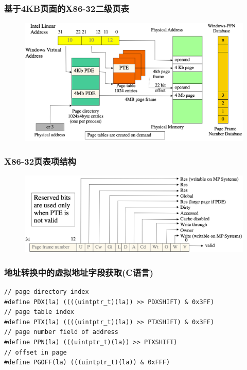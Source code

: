 \begin{frame}
    \frametitle{基于4KB页面的X86-32二级页表}
    \begin{figure}
    \includegraphics[width=0.8\linewidth]{figs/x86-32-addr-translation.png}
    \end{figure}
\end{frame}
% 
% 
% 
\begin{frame}
    \frametitle{X86-32页表项结构}
    \begin{figure}
    \includegraphics[width=1.0\linewidth]{figs/x86-32-page-tabel-entry.png}
    \end{figure}
\end{frame}
% 
% 
\begin{frame}
    \frametitle{地址转换中的虚拟地址字段获取(C语言)}
    \begin{block}{}
    \begin{verbatim}
// page directory index
#define PDX(la) ((((uintptr_t)(la)) >> PDXSHIFT) & 0x3FF)
// page table index
#define PTX(la) ((((uintptr_t)(la)) >> PTXSHIFT) & 0x3FF)
// page number field of address
#define PPN(la) (((uintptr_t)(la)) >> PTXSHIFT)
// offset in page
#define PGOFF(la) (((uintptr_t)(la)) & 0xFFF)
    \end{verbatim}
    \end{block}
\end{frame}
